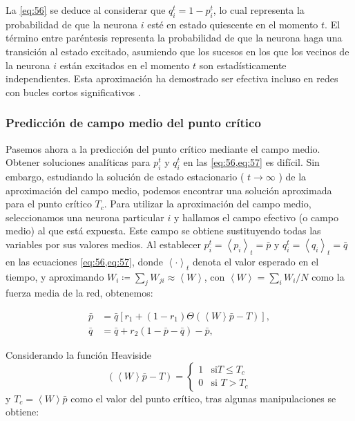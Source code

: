 La \cref{eq:56} se deduce al considerar que  $q_i^t=1-p_i^t$, lo cual representa la probabilidad de que la neurona $i$ esté en estado quiescente en el momento $t$. El término entre paréntesis representa la probabilidad de que la neurona haga una transición al estado excitado, asumiendo que los sucesos en los que los vecinos de la neurona $i$ están excitados en el momento  $t$ son estadísticamente independientes.  Esta aproximación ha demostrado ser efectiva incluso en redes con bucles cortos significativos \cite{rocha_homeostatic_2018,larremore_predicting_2011}.


\subsubsection{Predicción de campo medio del punto crítico}

Pasemos ahora a la predicción del punto crítico mediante el campo medio. Obtener soluciones analíticas para  $p_i^t$ y $q_i^t$ en  las \cref{eq:56,eq:57} es difícil. Sin embargo, estudiando la solución de estado estacionario  ( $t \to\infty$ ) de la aproximación del campo medio, podemos encontrar una solución aproximada para el punto crítico $T_c$.  Para utilizar la aproximación del campo medio, seleccionamos una neurona particular $i$  y hallamos el campo efectivo (o campo medio) al que está expuesta.  Este campo se obtiene sustituyendo todas las variables por sus valores medios. Al establecer  $p_i^t = \left\langle p_i \right\rangle_t   = \bar{p}$ y $q_i^t =\left\langle q_i\right\rangle_t = \bar{q}$ en las ecuaciones \cref{eq:56,eq:57}, donde $\left\langle \cdot \right\rangle_t$ denota el valor esperado en el tiempo, y aproximando $W_i \coloneqq \sum_j W_{ji} \approx \left\langle W \right\rangle$,  con $\left\langle W \right\rangle = \sum_i W_i/N$ como la fuerza media de la red, obtenemos:
 

\begin{align}
	\bar{p}&=\bar{q}\left[r_1+\left(1-r_1\right)\Theta\left(\left< W\right>\bar{p}-T\right)\right], \label{eq:76}\\
	\bar{q}&=\bar{q}+r_2\left(1-\bar{p}-\bar{q}\right)-\bar{p} \label{eq:77},
\end{align}

Considerando la función Heaviside \[\left(\left< W\right>\bar{p}-T\right) = \begin{cases}
	1 & \text{si} T\leq T_c\\
	0 & \text{si } T>T_c
\end{cases}\] y $T_c=\left< W\right>\bar{p}$ como el valor del punto crítico, tras algunas manipulaciones se obtiene:

